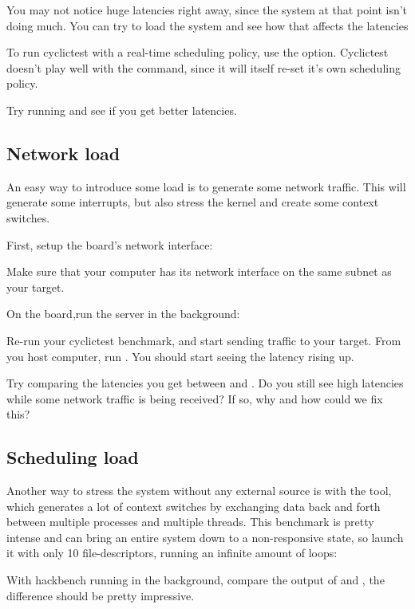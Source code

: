 You may not notice huge latencies right away, since the system at that point isn't
doing much. You can try to load the system and see how that affects the latencies

To run cyclictest with a real-time scheduling policy, use the  option.
Cyclictest doesn't play well with the  command, since it will itself re-set
it's own scheduling policy.

Try running  and see if you get better latencies.

\subsection{Network load}

An easy way to introduce some load is to generate some network traffic. This will
generate some interrupts, but also stress the kernel and create some context switches.

First, setup the board's network interface:



Make sure that your computer has its network interface on the same subnet as your
target.

On the board,run the  server in the background:


Re-run your cyclictest benchmark, and start sending traffic to your target. From
you host computer, run . You should start
seeing the latency rising up.

Try comparing the latencies you get between  and . Do you
still see high latencies while some network traffic is being received? If so, why and how
could we fix this?

\subsection{Scheduling load}

Another way to stress the system without any external source is with the 
tool, which generates a lot of context switches by exchanging data back and forth between
multiple processes and multiple threads. This benchmark is pretty intense and can bring
an entire system down to a non-responsive state, so launch it with only 10 file-descriptors,
running an infinite amount of loops:


With hackbench running in the background, compare the output of  and , the
difference should be pretty impressive.

